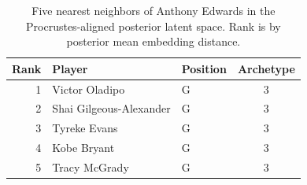 \begin{table}[htbp]
  \centering\small
  \begin{tabular}{rllc}
    \toprule
    Rank & Player & Position & Archetype \\
    \midrule
    1 & Victor Oladipo & G & 3 \\
    2 & Shai Gilgeous-Alexander & G & 3 \\
    3 & Tyreke Evans & G & 3 \\
    4 & Kobe Bryant & G & 3 \\
    5 & Tracy McGrady & G & 3 \\
    \bottomrule
  \end{tabular}
  \caption{Five nearest neighbors of Anthony Edwards in the Procrustes-aligned posterior latent space. Rank is by posterior mean embedding distance.}
  \label{tab:Anthony_Edwards_neighbors}
\end{table}

